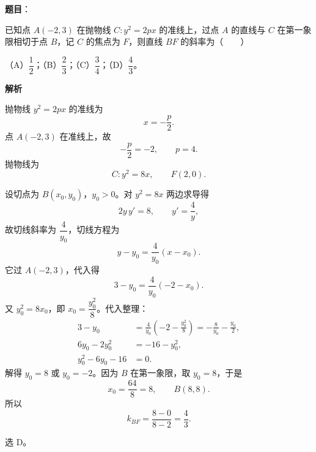 \begin{answer}

\textbf{题目}：

已知点 $A(-2,3)$ 在抛物线 $C:y^2=2px$ 的准线上，过点 $A$ 的直线与 $C$ 在第一象限相切于点 $B$，记 $C$ 的焦点为 $F$，则直线 $BF$ 的斜率为\mbox{（　　）}

（A）$\dfrac12$；（B）$\dfrac23$；（C）$\dfrac34$；（D）$\dfrac43$。

\textbf{解析}

抛物线 $y^2=2px$ 的准线为
\nopagebreak[4]
\[x=-\frac p2.\]
点 $A(-2,3)$ 在准线上，故
\nopagebreak[4]
\[-\frac p2=-2,\qquad p=4.\]
抛物线为
\nopagebreak[4]
\[C:y^2=8x,\qquad F(2,0).\]

设切点为 $B(x_0,y_0)$，$y_0>0$。对 $y^2=8x$ 两边求导得
\nopagebreak[4]
\[2y\,y'=8,\qquad y'=\frac4y,\]
故切线斜率为 $\dfrac4{y_0}$，切线方程为
\nopagebreak[4]
\[y-y_0=\frac4{y_0}(x-x_0).\]
它过 $A(-2,3)$，代入得
\nopagebreak[4]
\[3-y_0=\frac4{y_0}(-2-x_0).\]
又 $y_0^2=8x_0$，即 $x_0=\dfrac{y_0^2}{8}$。代入整理：
\nopagebreak[4]
\[\begin{aligned}
3-y_0&=\frac4{y_0}\left(-2-\frac{y_0^2}{8}\right)
=-\frac8{y_0}-\frac{y_0}{2},\\
6y_0-2y_0^2&=-16-y_0^2,\\
y_0^2-6y_0-16&=0.
\end{aligned}\]
解得 $y_0=8$ 或 $y_0=-2$。因为 $B$ 在第一象限，取 $y_0=8$，于是
\nopagebreak[4]
\[x_0=\frac{64}{8}=8,\qquad B(8,8).\]
所以
\nopagebreak[4]
\[k_{BF}=\frac{8-0}{8-2}=\frac43.\]

选 D。


\end{answer}
